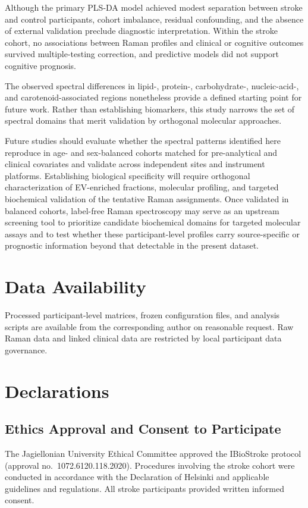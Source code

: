 \documentclass[preprint,12pt]{elsarticle}
\begin{document}
Although the primary PLS-DA model achieved modest separation between stroke and control participants, cohort imbalance, residual confounding, and the absence of external validation preclude diagnostic interpretation. Within the stroke cohort, no associations between Raman profiles and clinical or cognitive outcomes survived multiple-testing correction, and predictive models did not support cognitive prognosis.

The observed spectral differences in lipid-, protein-, carbohydrate-, nucleic-acid-, and carotenoid-associated regions nonetheless provide a defined starting point for future work. Rather than establishing biomarkers, this study narrows the set of spectral domains that merit validation by orthogonal molecular approaches.

Future studies should evaluate whether the spectral patterns identified here reproduce in age- and sex-balanced cohorts matched for pre-analytical and clinical covariates and validate across independent sites and instrument platforms. Establishing biological specificity will require orthogonal characterization of EV-enriched fractions, molecular profiling, and targeted biochemical validation of the tentative Raman assignments. Once validated in balanced cohorts, label-free Raman spectroscopy may serve as an upstream screening tool to prioritize candidate biochemical domains for targeted molecular assays and to test whether these participant-level profiles carry source-specific or prognostic information beyond that detectable in the present dataset.

\section*{Data Availability}

Processed participant-level matrices, frozen configuration files, and analysis scripts are available from the corresponding author on reasonable request. Raw Raman data and linked clinical data are restricted by local participant data governance. 

\section*{Declarations}

\subsection*{Ethics Approval and Consent to Participate}
The Jagiellonian University Ethical Committee approved the IBioStroke protocol (approval no.\ 1072.6120.118.2020). Procedures involving the stroke cohort were conducted in accordance with the Declaration of Helsinki and applicable guidelines and regulations. All stroke participants provided written informed consent.
\end{document}
